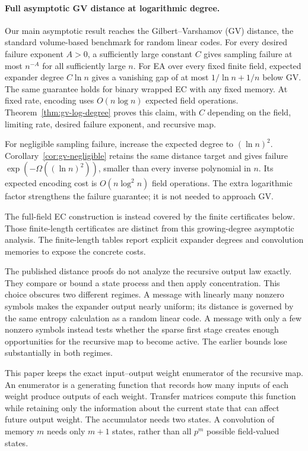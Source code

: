 \paragraph{Full asymptotic GV distance at logarithmic degree.}
Our main asymptotic result reaches the Gilbert--Varshamov (GV) distance,
the standard volume-based benchmark for random linear codes.
For every desired failure exponent $A>0$, a sufficiently large constant $C$
gives sampling failure at most $n^{-A}$ for all sufficiently large $n$.
For EA over every fixed finite field, expected expander degree $C\ln n$
gives a vanishing gap of at most $1/\ln n+1/n$ below GV.
The same guarantee holds for binary wrapped EC with any fixed memory.
At fixed rate, encoding uses $O(n\log n)$ expected field operations.
Theorem~\ref{thm:gv-log-degree} proves this claim, with $C$ depending on the
field, limiting rate, desired failure exponent, and recursive map.

For negligible sampling failure, increase the expected degree to $(\ln n)^2$.
Corollary~\ref{cor:gv-negligible} retains the same distance target and gives
failure $\exp(-\Omega((\ln n)^2))$, smaller than every inverse polynomial
in $n$.  Its expected encoding cost is $O(n\log^2 n)$ field operations.
The extra logarithmic factor strengthens the failure guarantee; it is not
needed to approach GV.

The full-field EC construction is instead covered by the finite certificates
below.  Those finite-length certificates are distinct from this growing-degree
asymptotic analysis.  The finite-length tables report
explicit expander degrees and convolution memories to expose the concrete
costs.

The published distance proofs do not analyze the recursive output law
exactly.  They compare or bound a state process and then apply concentration.
This choice obscures two different regimes.  A message with linearly many
nonzero symbols makes the expander output nearly uniform; its distance is
governed by the same entropy calculation as a random linear code.  A message
with only a few nonzero symbols instead tests whether the sparse first stage
creates enough opportunities for the recursive map to become active.  The
earlier bounds lose substantially in both regimes.

This paper keeps the exact input--output weight enumerator of the recursive
map.  An enumerator is a generating function that records how many inputs of
each weight produce outputs of each weight.  Transfer matrices compute this
function while retaining only the information about the current state that
can affect future output weight.  The accumulator needs two states.  A
convolution of memory $m$ needs only $m+1$ states, rather than all $p^m$
possible field-valued states.

